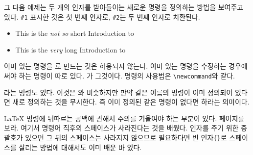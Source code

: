 그 다음 예제는 두 개의 인자를 받아들이는 새로운 명령을 정의하는 방법을 보여주고 있다.
\verb|#1| 표시한 것은 첫 번째 인자로, \verb|#2|는 두 번째 인자로 치환된다.

\begin{example}
\newcommand{\txsit}[2]
 {This is the \emph{#1}
  #2 Introduction to \LaTeXe}
\begin{itemize}
\item \txsit{not so}{short}
\item \txsit{very}{long}
\end{itemize}
\end{example}

이미 있는 명령을 로 만드는 것은 허용되지 않는다. 이미 있는 명령을 
수정하는 경우에 써야 하는 명령이 따로 있다. 가 그것이다.
명령의 사용법은 \verb|\newcommand|와 같다.

라는 명령도 있다. 이것은 와 비슷하지만 만약 같은 이름의 명령이 이미 정의되어 있다면 새로 정의하는 것을 무시한다. 즉 이미 정의된 같은 명령이 없다면 하라는 의미이다.

\LaTeX{} 명령에 뒤따르는 공백에 관해서 주의를 기울여야 하는 부분이 있다. 
\pageref{whitespace}페이지를 보라. 여기서 명령어 직후의 스페이스가 
사라진다는 것을 배웠다. 인자를 주기 위한 중괄호가 있으면 그 뒤의 스페이스는 
사라지지 않으므로 필요하다면 빈 인자\verb|{}|로 스페이스를 살리는 방법에 대해서도 
이미 배운 바 있다.

